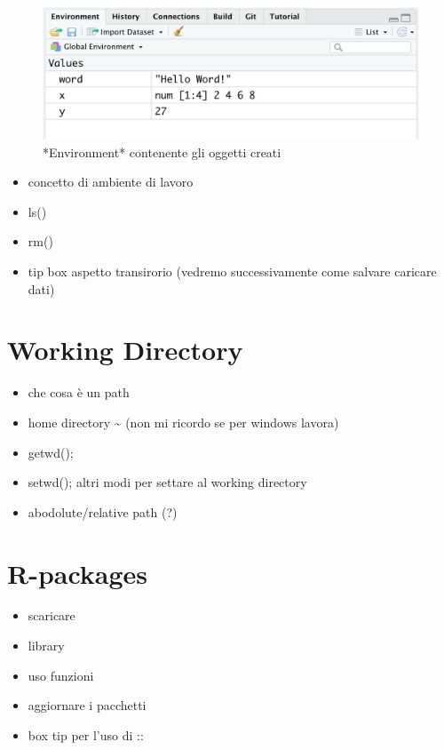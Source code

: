 \documentclass[
]{book}
\begin{document}
\begin{figure}

{\centering \includegraphics[width=0.6\linewidth]{images/environment-objects} 

}

\caption{*Environment* contenente gli oggetti creati}\label{fig:environment-object}
\end{figure}

\begin{itemize}
\item
  concetto di ambiente di lavoro
\item
  ls()
\item
  rm()
\item
  tip box aspetto transirorio (vedremo successivamente come salvare caricare dati)
\end{itemize}

\hypertarget{working-directory}{%
\section{Working Directory}\label{working-directory}}

\begin{itemize}
\item
  che cosa è un path
\item
  home directory \textasciitilde{} (non mi ricordo se per windows lavora)
\item
  getwd();
\item
  setwd(); altri modi per settare al working directory
\item
  abodolute/relative path (?)
\end{itemize}

\hypertarget{r-packages}{%
\section{R-packages}\label{r-packages}}

\begin{itemize}
\item
  scaricare
\item
  library
\item
  uso funzioni
\item
  aggiornare i pacchetti
\item
  box tip per l'uso di ::
\end{itemize}
\end{document}
